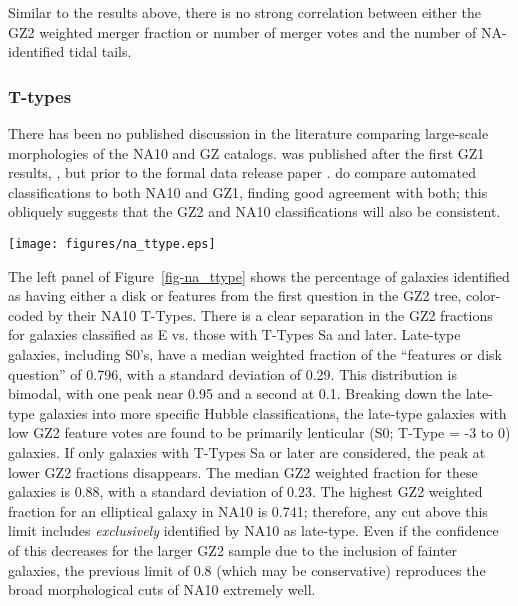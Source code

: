 \documentclass[useAMS,usenatbib]{mn2e}
\begin{document}
Similar to the results above, there is no strong correlation between either the GZ2 weighted merger fraction or number of merger votes and the number of NA-identified tidal tails. 

\subsubsection{T-types}

There has been no published discussion in the literature comparing large-scale morphologies of the NA10 and GZ catalogs. \citet{nai10} was published after the first GZ1 results, \citep{lin08}, but prior to the formal data release paper \citep{lin11}. \citet{hue11} do compare automated classifications to both NA10 and GZ1, finding good agreement with both; this obliquely suggests that the GZ2 and NA10 classifications will also be consistent. 

\begin{figure*}
\texttt{[image: figures/na\_ttype.eps]}
\caption{NA10 T-Type classifications compared to GZ2. Data on the left are for the 12,480 galaxies found in both samples; the right only shows the 5,683 galaxies with at least 10 responses to Task 04 (visible spiral structure) in GZ2. 
\label{fig-na_ttype}}
\end{figure*}

The left panel of Figure~\ref{fig-na_ttype} shows the percentage of galaxies identified as having either a disk or features from the first question in the GZ2 tree, color-coded by their NA10 T-Types. There is a clear separation in the GZ2 fractions for galaxies classified as E vs. those with T-Types Sa and later. Late-type galaxies, including S0's, have a median weighted fraction of the ``features or disk question'' of 0.796, with a standard deviation of 0.29. This distribution is bimodal, with one peak near 0.95 and a second at 0.1. Breaking down the late-type galaxies into more specific Hubble classifications, the late-type galaxies with low GZ2 feature votes are found to be primarily lenticular (S0; T-Type = -3 to 0) galaxies. If only galaxies with T-Types Sa or later are considered, the peak at lower GZ2 fractions disappears. The median GZ2 weighted fraction for these galaxies is 0.88, with a standard deviation of 0.23. The highest GZ2 weighted fraction for an elliptical galaxy in NA10 is 0.741; therefore, any cut above this limit includes {\it exclusively} identified by NA10 as late-type. Even if the confidence of this decreases for the larger GZ2 sample due to the inclusion of fainter galaxies, the previous limit of 0.8 (which may be conservative) reproduces the broad morphological cuts of NA10 extremely well. 
\end{document}
